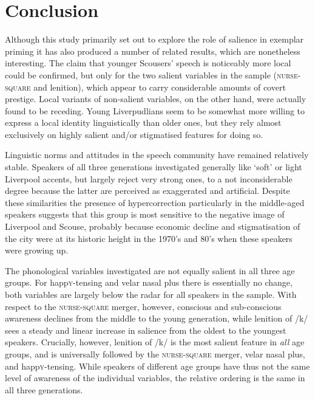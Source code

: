 \chapter{Conclusion}
\label{ch.conclusion}

Although this study primarily set out to explore the role of salience in exemplar priming it has also produced a number of related results, which are nonetheless interesting.
The claim that younger Scousers' speech is noticeably more local \parencite[cf.][]{watson2007a} could be confirmed, but only for the two salient variables in the sample (\textsc{nurse}-\textsc{square} and lenition), which appear to carry considerable amounts of covert prestige.
Local variants of non-salient variables, on the other hand, were actually found to be receding.
Young Liverpudlians seem to be somewhat more willing to express a local identity linguistically than older ones, but they rely almost exclusively on highly salient and/or stigmatised features for doing so.

Linguistic norms and attitudes in the speech community have remained relatively stable.
Speakers of all three generations investigated generally like `soft' or light Liverpool accents, but largely reject very strong ones, to a not inconsiderable degree because the latter are perceived as exaggerated and artificial.
Despite these similarities the presence of hypercorrection particularly in the middle-aged speakers suggests that this group is most sensitive to the negative image of Liverpool and Scouse, probably because economic decline and stigmatisation of the city were at its historic height in the 1970's and 80's when these speakers were growing up.

The phonological variables investigated are not equally salient in all three age groups.
For happ\textsc{y}-tensing and velar nasal plus there is essentially no change, both variables are largely below the radar for all speakers in the sample.
With respect to the \textsc{nurse}-\textsc{square} merger, however, conscious and sub-conscious awareness declines from the middle to the young generation, while lenition of /k/ sees a steady and linear increase in salience from the oldest to the youngest speakers.
Crucially, however, lenition of /k/ is the most salient feature in \emph{all} age groups, and is universally followed by the \textsc{nurse}-\textsc{square} merger, velar nasal plus, and happ\textsc{y}-tensing.
While speakers of different age groups have thus not the same level of awareness of the individual variables, the relative ordering is the same in all three generations.

